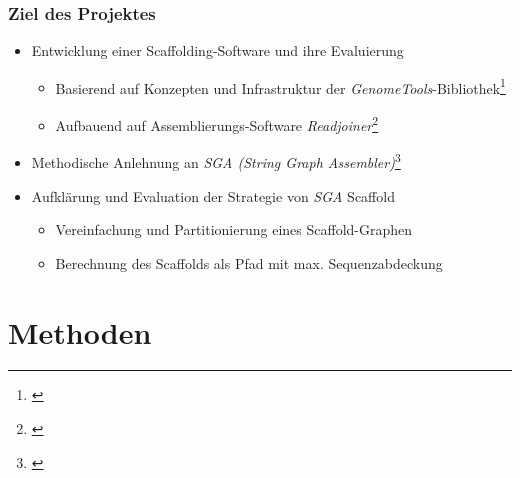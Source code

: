 \documentclass[xcolor=pst]{beamer}
\begin{document}
\begin{frame}
  \frametitle{Ziel des Projektes}
  \begin{itemize}
  \item Entwicklung einer Scaffolding-Software und ihre Evaluierung
  \begin{itemize}
    \item Basierend auf Konzepten und Infrastruktur der \textit{GenomeTools}-Bibliothek\footnote{\cite{Gremme:2013}}
    \item Aufbauend auf Assemblierungs-Software \textit{Readjoiner}\footnote{\cite{Gonnella:2012gn}}
  \end{itemize}
  \item Methodische Anlehnung an \textit{SGA (String Graph Assembler)}\footnote{\cite{Simpson:2012ef}}
  \item Aufklärung und Evaluation der Strategie von \textit{SGA} Scaffold
  \begin{itemize}
    \item Vereinfachung und Partitionierung eines Scaffold-Graphen
    \item Berechnung des Scaffolds als Pfad mit max. Sequenzabdeckung
  \end{itemize}
  \end{itemize}
\end{frame}

\section{Methoden}
\end{document}
